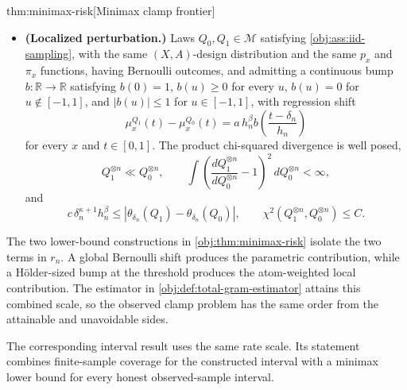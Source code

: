 \documentclass[11pt]{article}
\begin{document}
\begin{theoremv}{thm:minimax-risk}[Minimax clamp frontier]
\begin{itemize}
\[\]
and
\[
c n^{-1/2}
\leq
\left|\theta_{\delta_n}(P_1)-\theta_{\delta_n}(P_0)\right|,
\qquad
\chi^2\!\left(P_1^{\otimes n},P_0^{\otimes n}\right)\leq C .
\]
\item \textbf{(Localized perturbation.)} Laws \(Q_0,Q_1\in\mathcal M\) satisfying \cref{obj:ass:iid-sampling}, with the same \((X,A)\)-design distribution and the same \(p_x\) and \(\pi_x\) functions, having Bernoulli outcomes, and admitting a continuous bump \(b:\mathbb R\to\mathbb R\) satisfying \(b(0)=1\), \(b(u)\geq0\) for every \(u\), \(b(u)=0\) for \(u\notin[-1,1]\), and \(|b(u)|\leq1\) for \(u\in[-1,1]\), with regression shift
\[
\mu_x^{Q_1}(t)-\mu_x^{Q_0}(t)
=
a\,h_n^\beta b\!\left(\frac{t-\delta_n}{h_n}\right)
\]
for every \(x\) and \(t\in[0,1]\). The product chi-squared divergence is well posed,
\[
Q_1^{\otimes n}\ll Q_0^{\otimes n},
\qquad
\int \left(\frac{dQ_1^{\otimes n}}{dQ_0^{\otimes n}}-1\right)^2\,dQ_0^{\otimes n}<\infty,
\]
and
\[
c\,\delta_n^{\kappa+1}h_n^\beta
\leq
\left|\theta_{\delta_n}(Q_1)-\theta_{\delta_n}(Q_0)\right|,
\qquad
\chi^2\!\left(Q_1^{\otimes n},Q_0^{\otimes n}\right)\leq C .
\]
\end{itemize}
\end{theoremv}

The two lower-bound constructions in \cref{obj:thm:minimax-risk} isolate the two terms in \(r_n\). A global Bernoulli shift produces the parametric contribution, while a Hölder-sized bump at the threshold produces the atom-weighted local contribution. The estimator in \cref{obj:def:total-gram-estimator} attains this combined scale, so the observed clamp problem has the same order from the attainable and unavoidable sides.

The corresponding interval result uses the same rate scale. Its statement combines finite-sample coverage for the constructed interval with a minimax lower bound for every honest observed-sample interval.
\end{document}
